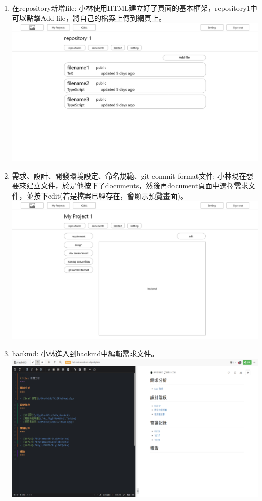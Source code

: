 \documentclass{report}
\begin{document}
\begin{enumerate}[label=(\Alph*)]
  \item 在repository新增file: 小林使用HTML建立好了頁面的基本框架，repository1中可以點擊Add file，將自己的檔案上傳到網頁上。\\
  \includegraphics[width=\textwidth]{assets/wireframe/My_projects_add_file.png }
  \item 需求、設計、開發環境設定、命名規範、git commit format文件: 小林現在想要來建立文件，於是他按下了documents，然後再document頁面中選擇需求文件，並按下edit(若是檔案已經存在，會顯示預覽畫面)。\\
  \includegraphics[width=\textwidth]{assets/wireframe/My_Projects_documents_requirement_dev_environment_naming_convention_git commit format.png }
  \item hackmd: 小林進入到hackmd中編輯需求文件。\\
  \includegraphics[width=\textwidth]{assets/wireframe/hackmd.png}

\end{enumerate}
\end{document}
